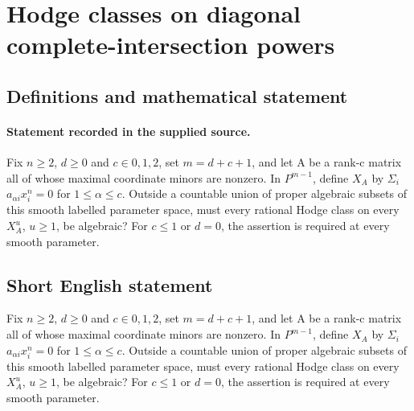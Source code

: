 \documentclass[11pt]{article}
\begin{document}
\section*{Hodge classes on diagonal complete-intersection powers}\label{30007035}
\subsection{Definitions and mathematical statement}
\paragraph{Statement recorded in the supplied source.}
Fix $n\geq 2$, $d\geq 0$ and $c\in {0,1,2}$, set $m=d+c+1$, and let A be a rank-c matrix all of whose maximal coordinate minors are nonzero. In $P^{m-1}$, define $X_A$ by $\Sigma _i$ $a_{\alpha i}x_i^n=0$ for $1\leq \alpha \leq c$. Outside a countable union of proper algebraic subsets of this smooth labelled parameter space, must every rational Hodge class on every $X_A^u$, $u\geq 1$, be algebraic? For $c\leq 1$ or $d=0$, the assertion is required at every smooth parameter.
\subsection{Short English statement}
Fix $n\geq 2$, $d\geq 0$ and $c\in {0,1,2}$, set $m=d+c+1$, and let A be a rank-c matrix all of whose maximal coordinate minors are nonzero. In $P^{m-1}$, define $X_A$ by $\Sigma _i$ $a_{\alpha i}x_i^n=0$ for $1\leq \alpha \leq c$. Outside a countable union of proper algebraic subsets of this smooth labelled parameter space, must every rational Hodge class on every $X_A^u$, $u\geq 1$, be algebraic? For $c\leq 1$ or $d=0$, the assertion is required at every smooth parameter.
\end{document}
